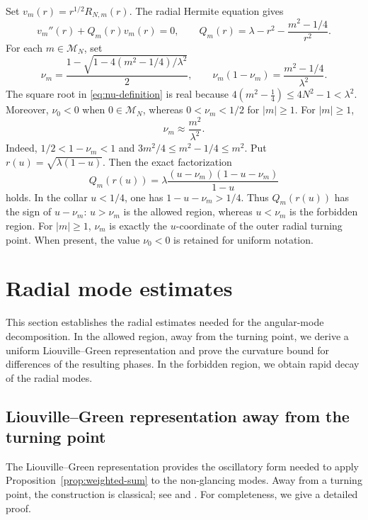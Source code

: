 \documentclass[11pt,a4paper]{amsart}
\numberwithin{equation}{section}
\begin{document}
Set \(v_m(r)=r^{1/2}R_{N,m}(r)\). The radial Hermite equation gives
\[
 v_m''(r)+Q_m(r)v_m(r)=0,
 \qquad
 Q_m(r)=\lambda-r^2-\frac{m^2-1/4}{r^2}.
\]
For each \(m\in\mathcal M_N\), set
\begin{equation}\label{eq:nu-definition}
 \nu_m=\frac{1-\sqrt{1-4(m^2-1/4)/\lambda^2}}2,
 \qquad
 \nu_m(1-\nu_m)=\frac{m^2-1/4}{\lambda^2}.
\end{equation}
The square root in \eqref{eq:nu-definition} is real because
\(4(m^2-\tfrac14)\le4N^2-1<\lambda^2\). Moreover, \(\nu_0<0\) when
\(0\in\mathcal M_N\), whereas \(0<\nu_m<1/2\) for \(|m|\ge1\). For
\(|m|\ge1\),
\begin{equation}\label{eq:nu-m-comparable}
 \nu_m\approx\frac{m^2}{\lambda^2}.
\end{equation}
Indeed, \(1/2<1-\nu_m<1\) and
\(3m^2/4\le m^2-1/4\le m^2\).
Put \(r(u)=\sqrt{\lambda(1-u)}\). Then the exact factorization
\begin{equation}\label{eq:Q-factor-u}
 Q_m(r(u))=
 \lambda\frac{(u-\nu_m)(1-u-\nu_m)}{1-u}
\end{equation}
holds. In the collar \(u<1/4\), one has \(1-u-\nu_m>1/4\). Thus
\(Q_m(r(u))\) has the sign of \(u-\nu_m\): \(u>\nu_m\) is the
allowed region, whereas \(u<\nu_m\) is the forbidden region. For \(|m|\ge1\), \(\nu_m\)
is exactly the \(u\)-coordinate of the outer radial turning point. When
present, the value \(\nu_0<0\) is retained for uniform notation.

\section{Radial mode estimates}\label{sec:radial}

This section establishes the radial estimates needed for the angular-mode
decomposition. In the allowed region, away from the turning
point, we derive a uniform Liouville--Green representation and prove the
curvature bound for differences of the resulting phases. In the forbidden
region, we obtain rapid decay of the radial modes. 

\subsection{Liouville--Green representation away from the turning point}

\noindent\hspace*{\parindent}The Liouville--Green representation provides the
oscillatory form needed to apply Proposition~\ref{prop:weighted-sum} to the
non-glancing modes. Away from a turning point, the construction is classical;
see \cite[Chapter~6, Sections~1--5]{Olver} and \cite{OlverLG}. For completeness,
we give a detailed proof.
\end{document}
